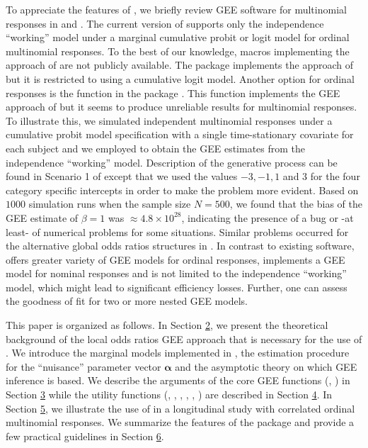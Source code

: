 \documentclass[
]{jss}
\begin{document}
To appreciate the features of , we briefly review GEE
software for multinomial responses in  \citep{SAS} and
. The current version of  supports only the
independence ``working'' model under a marginal cumulative probit or
logit model for ordinal multinomial responses. To the best of our
knowledge,  macros \citep{Williamson1998, Yu2004}
implementing the approach of \citet{Williamson1995} are not publicly
available. The  package  \citep{Parsons2013}
implements the approach of \citet{Parsons2006} but it is restricted to
using a cumulative logit model. Another option for ordinal responses is
the function  in the  package 
\citep{Hojsgaard2006}. This function implements the GEE approach of
\citet{Heagerty1996} but it seems to produce unreliable results for
multinomial responses. To illustrate this, we simulated independent
multinomial responses under a cumulative probit model specification with
a single time-stationary covariate for each subject and we employed
 to obtain the GEE estimates from the independence
``working'' model. Description of the generative process can be found in
Scenario 1 of \citet{Touloumis2012} except that we used the values
\(-3,-1,1\) and \(3\) for the four category specific intercepts in order
to make the problem more evident. Based on \(1000\) simulation runs when
the sample size \(N=500\), we found that the bias of the GEE estimate of
\(\beta=1\) was \(\approx 4.8 \times 10^{28}\), indicating the presence
of a bug or -at least- of numerical problems for some situations.
Similar problems occurred for the alternative global odds ratios
structures in . In contrast to existing software,
 offers greater variety of GEE models for ordinal
responses, implements a GEE model for nominal responses and is not
limited to the independence ``working'' model, which might lead to
significant efficiency losses. Further, one can assess the goodness of
fit for two or more nested GEE models.

This paper is organized as follows. In Section
\protect\hyperlink{GEENotation}{2}, we present the theoretical
background of the local odds ratios GEE approach that is necessary for
the use of . We introduce the marginal models implemented
in , the estimation procedure for the ``nuisance''
parameter vector \(\boldsymbol \alpha\) and the asymptotic theory on
which GEE inference is based. We describe the arguments of the core GEE
functions (, ) in Section
\protect\hyperlink{Description1}{3} while the utility functions
(, , , ,
, ) are described in Section
\protect\hyperlink{Description2}{4}. In Section
\protect\hyperlink{Example}{5}, we illustrate the use of 
in a longitudinal study with correlated ordinal multinomial responses.
We summarize the features of the package and provide a few practical
guidelines in Section \protect\hyperlink{Summary}{6}.
\end{document}
